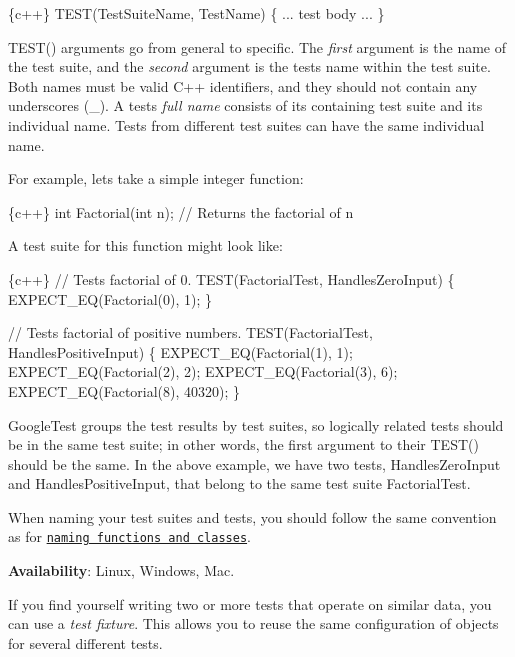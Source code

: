 \begin{DoxyCode}
\{c++\}
TEST(TestSuiteName, TestName) \{
  ... test body ...
\}
\end{DoxyCode}


{\ttfamily T\+E\+S\+T()} arguments go from general to specific. The {\itshape first} argument is the name of the test suite, and the {\itshape second} argument is the test\textquotesingle{}s name within the test suite. Both names must be valid C++ identifiers, and they should not contain any underscores ({\ttfamily \+\_\+}). A test\textquotesingle{}s {\itshape full name} consists of its containing test suite and its individual name. Tests from different test suites can have the same individual name.

For example, let\textquotesingle{}s take a simple integer function\+:


\begin{DoxyCode}
\{c++\}
int Factorial(int n);  // Returns the factorial of n
\end{DoxyCode}


A test suite for this function might look like\+:


\begin{DoxyCode}
\{c++\}
// Tests factorial of 0.
TEST(FactorialTest, HandlesZeroInput) \{
  EXPECT\_EQ(Factorial(0), 1);
\}

// Tests factorial of positive numbers.
TEST(FactorialTest, HandlesPositiveInput) \{
  EXPECT\_EQ(Factorial(1), 1);
  EXPECT\_EQ(Factorial(2), 2);
  EXPECT\_EQ(Factorial(3), 6);
  EXPECT\_EQ(Factorial(8), 40320);
\}
\end{DoxyCode}


Google\+Test groups the test results by test suites, so logically related tests should be in the same test suite; in other words, the first argument to their {\ttfamily T\+E\+S\+T()} should be the same. In the above example, we have two tests, {\ttfamily Handles\+Zero\+Input} and {\ttfamily Handles\+Positive\+Input}, that belong to the same test suite {\ttfamily Factorial\+Test}.

When naming your test suites and tests, you should follow the same convention as for \href{https://google.github.io/styleguide/cppguide.html#Function_Names}{\tt naming functions and classes}.

{\bfseries Availability}\+: Linux, Windows, Mac.

If you find yourself writing two or more tests that operate on similar data, you can use a {\itshape test fixture}. This allows you to reuse the same configuration of objects for several different tests.

